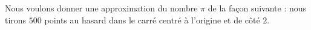 
\begin{exercice}\label{exosmath-0582}

    Nous voulons donner une approximation du nombre \( \pi\) de la façon suivante : nous tirons \( 500\) points au hasard dans le carré centré à l'origine et de côté \( 2\). 

\end{exercice}
